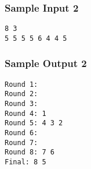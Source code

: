 \subsubsection{Sample Input 2}\label{sample-input-2}
\begin{verbatim}
8 3
5 5 5 5 6 4 4 5
\end{verbatim}

\subsubsection{Sample Output 2}\label{sample-output-2}
\begin{verbatim}
Round 1:
Round 2:
Round 3:
Round 4: 1
Round 5: 4 3 2
Round 6:
Round 7:
Round 8: 7 6
Final: 8 5
\end{verbatim}